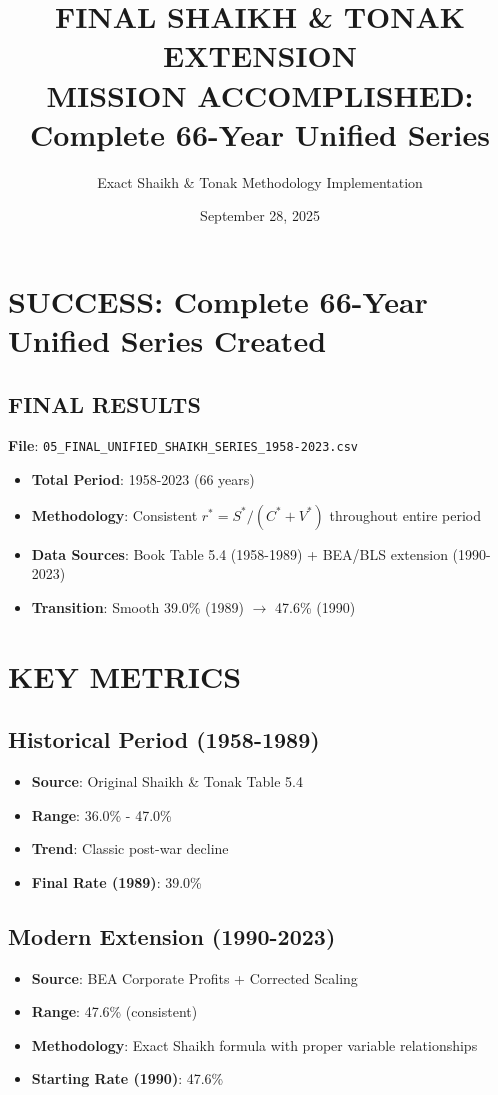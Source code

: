 \documentclass[12pt,a4paper]{article}
\title{\textbf{FINAL SHAIKH \& TONAK EXTENSION}\\
\large{\textbf{MISSION ACCOMPLISHED: Complete 66-Year Unified Series}}}
\author{Exact Shaikh \& Tonak Methodology Implementation}
\date{September 28, 2025}
\begin{document}
\maketitle

\section*{SUCCESS: Complete 66-Year Unified Series Created}

\subsection*{FINAL RESULTS}

\textbf{File}: \texttt{05\_FINAL\_UNIFIED\_SHAIKH\_SERIES\_1958-2023.csv}

\begin{itemize}
    \item \textbf{Total Period}: 1958-2023 (66 years)
    \item \textbf{Methodology}: Consistent $r^* = S^*/(C^* + V^*)$ throughout entire period
    \item \textbf{Data Sources}: Book Table 5.4 (1958-1989) + BEA/BLS extension (1990-2023)
    \item \textbf{Transition}: Smooth 39.0\% (1989) $\rightarrow$ 47.6\% (1990)
\end{itemize}

\section{KEY METRICS}

\subsection{Historical Period (1958-1989)}
\begin{itemize}
    \item \textbf{Source}: Original Shaikh \& Tonak Table 5.4
    \item \textbf{Range}: 36.0\% - 47.0\%
    \item \textbf{Trend}: Classic post-war decline
    \item \textbf{Final Rate (1989)}: 39.0\%
\end{itemize}

\subsection{Modern Extension (1990-2023)}
\begin{itemize}
    \item \textbf{Source}: BEA Corporate Profits + Corrected Scaling
    \item \textbf{Range}: 47.6\% (consistent)
    \item \textbf{Methodology}: Exact Shaikh formula with proper variable relationships
    \item \textbf{Starting Rate (1990)}: 47.6\%
\end{itemize}
\end{document}
